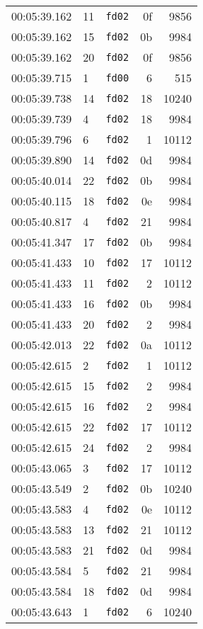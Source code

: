 \documentclass{article}
\begin{document}
\begin{longtable}{lllrr}
00:05:39.162 & 11 & \texttt{fd02} & 0f & 9856 \\
00:05:39.162 & 15 & \texttt{fd02} & 0b & 9984 \\
00:05:39.162 & 20 & \texttt{fd02} & 0f & 9856 \\
00:05:39.715 & 1 & \texttt{fd00} & 6 & 515 \\
00:05:39.738 & 14 & \texttt{fd02} & 18 & 10240 \\
00:05:39.739 & 4 & \texttt{fd02} & 18 & 9984 \\
00:05:39.796 & 6 & \texttt{fd02} & 1 & 10112 \\
00:05:39.890 & 14 & \texttt{fd02} & 0d & 9984 \\
00:05:40.014 & 22 & \texttt{fd02} & 0b & 9984 \\
00:05:40.115 & 18 & \texttt{fd02} & 0e & 9984 \\
00:05:40.817 & 4 & \texttt{fd02} & 21 & 9984 \\
00:05:41.347 & 17 & \texttt{fd02} & 0b & 9984 \\
00:05:41.433 & 10 & \texttt{fd02} & 17 & 10112 \\
00:05:41.433 & 11 & \texttt{fd02} & 2 & 10112 \\
00:05:41.433 & 16 & \texttt{fd02} & 0b & 9984 \\
00:05:41.433 & 20 & \texttt{fd02} & 2 & 9984 \\
00:05:42.013 & 22 & \texttt{fd02} & 0a & 10112 \\
00:05:42.615 & 2 & \texttt{fd02} & 1 & 10112 \\
00:05:42.615 & 15 & \texttt{fd02} & 2 & 9984 \\
00:05:42.615 & 16 & \texttt{fd02} & 2 & 9984 \\
00:05:42.615 & 22 & \texttt{fd02} & 17 & 10112 \\
00:05:42.615 & 24 & \texttt{fd02} & 2 & 9984 \\
00:05:43.065 & 3 & \texttt{fd02} & 17 & 10112 \\
00:05:43.549 & 2 & \texttt{fd02} & 0b & 10240 \\
00:05:43.583 & 4 & \texttt{fd02} & 0e & 10112 \\
00:05:43.583 & 13 & \texttt{fd02} & 21 & 10112 \\
00:05:43.583 & 21 & \texttt{fd02} & 0d & 9984 \\
00:05:43.584 & 5 & \texttt{fd02} & 21 & 9984 \\
00:05:43.584 & 18 & \texttt{fd02} & 0d & 9984 \\
00:05:43.643 & 1 & \texttt{fd02} & 6 & 10240 \\

\end{longtable}
\end{document}
